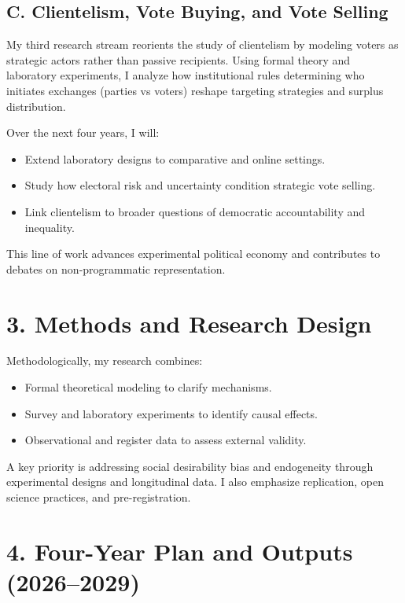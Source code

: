 \documentclass[letterpaper,11pt]{article}
\begin{document}
\subsection*{C. Clientelism, Vote Buying, and Vote Selling}

My third research stream reorients the study of clientelism by modeling voters as strategic actors rather than passive recipients. Using formal theory and laboratory experiments, I analyze how institutional rules determining who initiates exchanges (parties vs voters) reshape targeting strategies and surplus distribution.

Over the next four years, I will:
\begin{itemize}
  \item Extend laboratory designs to comparative and online settings.
  \item Study how electoral risk and uncertainty condition strategic vote selling.
  \item Link clientelism to broader questions of democratic accountability and inequality.
\end{itemize}

This line of work advances experimental political economy and contributes to debates on non-programmatic representation.

\section*{3. Methods and Research Design}

Methodologically, my research combines:
\begin{itemize}
  \item Formal theoretical modeling to clarify mechanisms.
  \item Survey and laboratory experiments to identify causal effects.
  \item Observational and register data to assess external validity.
\end{itemize}

A key priority is addressing social desirability bias and endogeneity through experimental designs and longitudinal data. I also emphasize replication, open science practices, and pre-registration.

\section*{4. Four-Year Plan and Outputs (2026--2029)}
\end{document}
